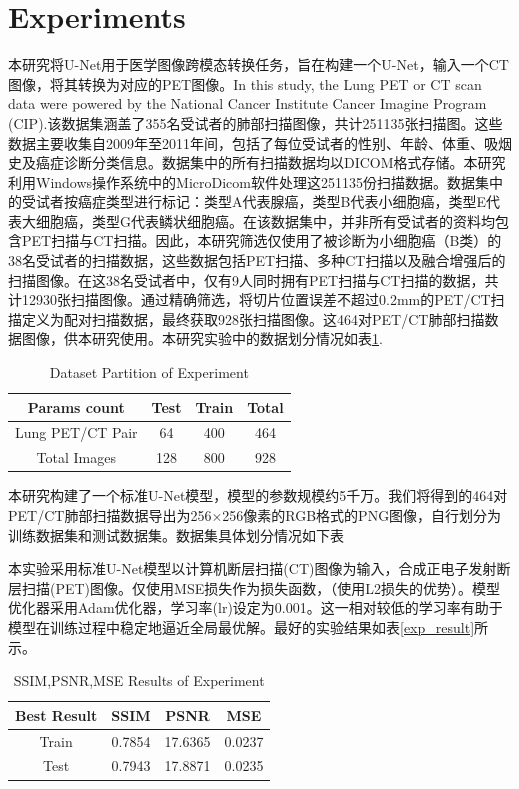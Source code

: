 \documentclass[twocolumn]{article}
\begin{document}
\section{Experiments}
本研究将U-Net用于医学图像跨模态转换任务，旨在构建一个U-Net，输入一个CT图像，将其转换为对应的PET图像。In this study, the Lung PET or CT scan data\cite{li_large-scale_2020} were powered by the National Cancer Institute Cancer Imagine Program (CIP).该数据集涵盖了355名受试者的肺部扫描图像，共计251135张扫描图。这些数据主要收集自2009年至2011年间，包括了每位受试者的性别、年龄、体重、吸烟史及癌症诊断分类信息。数据集中的所有扫描数据均以DICOM格式存储。本研究利用Windows操作系统中的MicroDicom软件处理这251135份扫描数据。数据集中的受试者按癌症类型进行标记：类型A代表腺癌，类型B代表小细胞癌，类型E代表大细胞癌，类型G代表鳞状细胞癌。在该数据集中，并非所有受试者的资料均包含PET扫描与CT扫描。因此，本研究筛选仅使用了被诊断为小细胞癌（B类）的38名受试者的扫描数据，这些数据包括PET扫描、多种CT扫描以及融合增强后的扫描图像。在这38名受试者中，仅有9人同时拥有PET扫描与CT扫描的数据，共计12930张扫描图像。通过精确筛选，将切片位置误差不超过0.2mm的PET/CT扫描定义为配对扫描数据，最终获取928张扫描图像。这464对PET/CT肺部扫描数据图像，供本研究使用。本研究实验中的数据划分情况如表\ref{tab:dataset_partition_1}.

\begin{table}[h]
	\centering
	\caption{Dataset Partition of Experiment}
	\label{tab:dataset_partition_1}
	\begin{tabular}{cccc}
		\toprule
		Params count & Test  & Train & Total  \\
		\midrule
		Lung PET/CT Pair & 64   & 400 & 464 \\
		Total Images    & 128   & 800 & 928 \\
		\bottomrule
	\end{tabular}
\end{table}

本研究构建了一个标准U-Net模型，模型的参数规模约5千万。我们将得到的464对PET/CT肺部扫描数据导出为256×256像素的RGB格式的PNG图像，自行划分为训练数据集和测试数据集。数据集具体划分情况如下表


本实验采用标准U-Net模型以计算机断层扫描(CT)图像为输入，合成正电子发射断层扫描(PET)图像。仅使用MSE损失作为损失函数，（使用L2损失的优势）。模型优化器采用Adam优化器，学习率(lr)设定为0.001。这一相对较低的学习率有助于模型在训练过程中稳定地逼近全局最优解。最好的实验结果如表\ref{exp_result}所示。

\begin{table}[h]
	\centering
	\caption{SSIM,PSNR,MSE Results of Experiment}
	\label{tab:exp_result}
	\begin{tabular}{cccc}
		\toprule
		Best Result & SSIM & PSNR & MSE  \\
		\midrule
		Train & 0.7854 & 17.6365 & 0.0237 \\
		Test  & 0.7943 & 17.8871 & 0.0235 \\
		\bottomrule
	\end{tabular}
\end{table}
\end{document}
